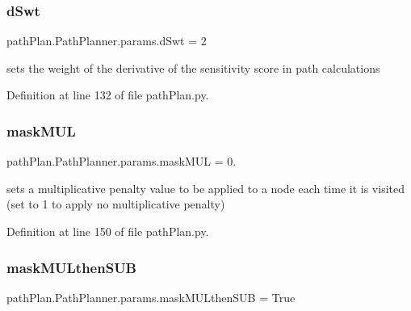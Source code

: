 \subsubsection{\texorpdfstring{d\+Swt}{dSwt}}
{\footnotesize\ttfamily path\+Plan.\+Path\+Planner.\+params.\+d\+Swt = 2\hspace{0.3cm}{\ttfamily [static]}}



sets the weight of the derivative of the sensitivity score in path calculations 



Definition at line 132 of file path\+Plan.\+py.

\mbox{\label{classpath_plan_1_1_path_planner_1_1params_a31a755ef7499eac2e90deb944c7f1d38}} 
\subsubsection{\texorpdfstring{mask\+M\+UL}{maskMUL}}
{\footnotesize\ttfamily path\+Plan.\+Path\+Planner.\+params.\+mask\+M\+UL = 0.\hspace{0.3cm}{\ttfamily [static]}}



sets a multiplicative penalty value to be applied to a node each time it is visited (set to 1 to apply no multiplicative penalty) 



Definition at line 150 of file path\+Plan.\+py.

\mbox{\label{classpath_plan_1_1_path_planner_1_1params_a8fb76a1325335d64cea705cc4efec3e8}} 
\subsubsection{\texorpdfstring{mask\+M\+U\+Lthen\+S\+UB}{maskMULthenSUB}}
{\footnotesize\ttfamily path\+Plan.\+Path\+Planner.\+params.\+mask\+M\+U\+Lthen\+S\+UB = True\hspace{0.3cm}{\ttfamily [static]}}




